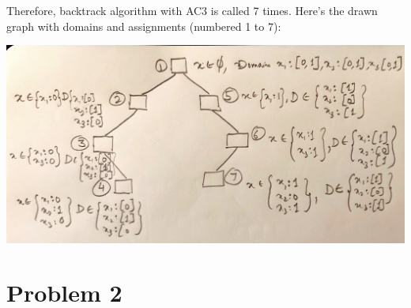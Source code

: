 \documentclass[12pt]{article}
\begin{document}
\begin{enumerate}[label=(\alph*)]
\begin{enumerate}[label=\roman*.]
  Therefore, backtrack algorithm with AC3 is called 7 times. Here's the drawn graph with domains and assignments (numbered 1 to 7):
    \begin{center}
  	\includegraphics[scale=0.1]{IMG_2249.jpg}
  	\end{center}
\end{enumerate}
\end{enumerate}
\section*{Problem 2}
\end{document}
